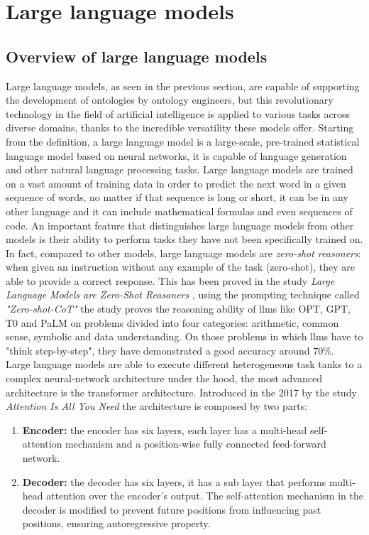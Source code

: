 \newpage
\section{Large language models}
\subsection{Overview of large language models}
Large language models, as seen in the previous section, are capable of supporting the development of ontologies by ontology engineers, but this revolutionary technology in the field of artificial intelligence is applied to various tasks across diverse domains, thanks to the incredible versatility these models offer. Starting from the definition, a large language model is a large-scale, pre-trained statistical language model based on neural networks, it is capable of language generation and other natural language processing tasks.\cite{llm_wiki} Large language models are trained on a vast amount of training data in order to predict the next word in a given sequence of words, no matter if that sequence is long or short, it can be in any other language and it can include mathematical formulas and even sequences of code.\cite{llm_medium} An important feature that distinguishes large language models from other models is their ability to perform tasks they have not been specifically trained on. In fact, compared to other models, large language models are \textit{zero-shot reasoners}: when given an instruction without any example of the task (zero-shot), they are able to provide a correct response. This has been proved in the study \textit{Large Language Models are Zero-Shot Reasoners} \cite{kojima2022large}, using the prompting technique called \textit{"Zero-shot-CoT"} the study proves the reasoning ability of llms like OPT, GPT, T0 and PaLM on problems divided into four categories: arithmetic, common sense, symbolic and data understanding. On those problems in which llms have to "think step-by-step", they have demonstrated a good accuracy around 70\%.\\
Large language models are able to execute different heterogeneous task tanks to a complex neural-network architecture under the hood, the most advanced architecture is the transformer architecture. Introduced in the 2017 by the study \textit{Attention Is All You Need}\cite{vaswani2017attention} the architecture is composed by two parts:
\begin{enumerate}
    \item \textbf{Encoder:} the encoder has six layers, each layer has a multi-head self-attention mechanism and a position-wise fully connected feed-forward network.

    \item \textbf{Decoder:} the decoder has six layers, it has a sub layer that performs multi-head attention over the encoder’s output. The self-attention mechanism in the decoder is modified to prevent future positions from influencing past positions, ensuring autoregressive property.
\end{enumerate}
